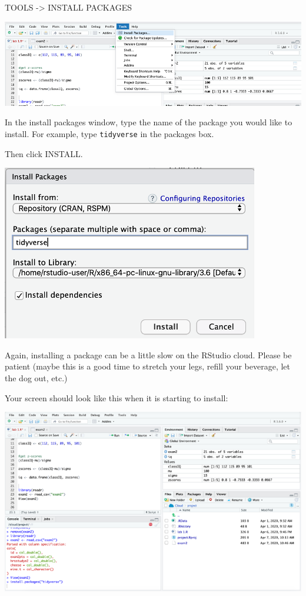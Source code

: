\documentclass[
]{book}
\begin{document}
TOOLS -\textgreater{} INSTALL PACKAGES

\includegraphics{img/instpacktools.png}

In the install packages window, type the name of the package you would like to install. For example, type \texttt{tidyverse} in the packages box.

Then click INSTALL.

\includegraphics{img/instpackguitidy.png}

Again, installing a package can be a little slow on the RStudio cloud. Please be patient (maybe this is a good time to stretch your legs, refill your beverage, let the dog out, etc.)

Your screen should look like this when it is starting to install:

\includegraphics{img/instload1.png}
\end{document}
